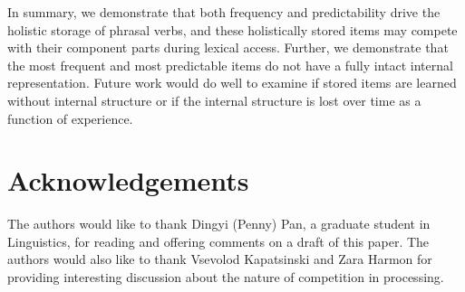 \documentclass[
  authoryear,
  preprint,
  1p,
  onecolumn]{elsarticle}
\begin{document}
In summary, we demonstrate that both frequency and predictability drive
the holistic storage of phrasal verbs, and these holistically stored
items may compete with their component parts during lexical access.
Further, we demonstrate that the most frequent and most predictable
items do not have a fully intact internal representation. Future work
would do well to examine if stored items are learned without internal
structure or if the internal structure is lost over time as a function
of experience.

\section{Acknowledgements}\label{acknowledgements}

The authors would like to thank Dingyi (Penny) Pan, a graduate student
in Linguistics, for reading and offering comments on a draft of this
paper. The authors would also like to thank Vsevolod Kapatsinski and
Zara Harmon for providing interesting discussion about the nature of
competition in processing.

\newpage


  
\end{document}
